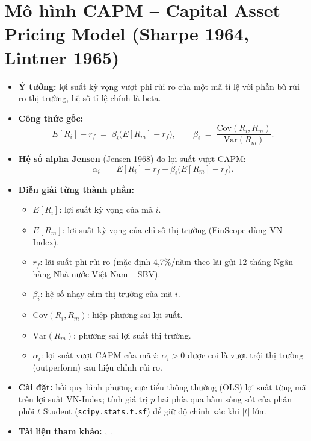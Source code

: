 \documentclass[12pt,a4paper,openany,oneside]{report}
\numberwithin{equation}{chapter}
\begin{document}
\section{Mô hình CAPM -- Capital Asset Pricing Model (Sharpe 1964, Lintner 1965)}

\begin{itemize}[leftmargin=18pt,topsep=2pt,itemsep=4pt]
  \item \textbf{Ý tưởng:} lợi suất kỳ vọng vượt phi rủi ro của một mã
        tỉ lệ với phần bù rủi ro thị trường, hệ số tỉ lệ chính là beta.
  \item \textbf{Công thức gốc:}
        \begin{equation}
          E[R_i] - r_f \;=\; \beta_i \bigl(E[R_m] - r_f\bigr),
          \qquad
          \beta_i \;=\; \frac{\mathrm{Cov}(R_i, R_m)}{\mathrm{Var}(R_m)}.
          \label{eq:capm}
        \end{equation}
  \item \textbf{Hệ số alpha Jensen} (Jensen 1968) đo lợi suất vượt CAPM:
        \begin{equation}
          \alpha_i \;=\; E[R_i] - r_f - \beta_i \bigl(E[R_m] - r_f\bigr).
          \label{eq:jensen}
        \end{equation}
  \item \textbf{Diễn giải từng thành phần:}
        \begin{itemize}[leftmargin=14pt,topsep=2pt,itemsep=1pt]
          \item $E[R_i]$: lợi suất kỳ vọng của mã $i$.
          \item $E[R_m]$: lợi suất kỳ vọng của chỉ số thị trường (FinScope
                dùng VN-Index).
          \item $r_f$: lãi suất phi rủi ro (mặc định 4,7\%/năm theo lãi
                gửi 12 tháng Ngân hàng Nhà nước Việt Nam -- SBV).
          \item $\beta_i$: hệ số nhạy cảm thị trường của mã $i$.
          \item $\mathrm{Cov}(R_i, R_m)$: hiệp phương sai lợi suất.
          \item $\mathrm{Var}(R_m)$: phương sai lợi suất thị trường.
          \item $\alpha_i$: lợi suất vượt CAPM của mã $i$; $\alpha_i > 0$
                được coi là vượt trội thị trường (outperform) sau hiệu
                chỉnh rủi ro.
        \end{itemize}
  \item \textbf{Cài đặt:} hồi quy bình phương cực tiểu thông thường
        (OLS) lợi suất từng mã trên lợi suất VN-Index; tính giá trị
        $p$ hai phía qua hàm sống sót của phân phối $t$ Student
        (\texttt{scipy.stats.t.sf}) để giữ độ chính xác khi $|t|$ lớn.
  \item \textbf{Tài liệu tham khảo:} \citet{Sharpe1964}, \citet{Lintner1965}.
\end{itemize}
\end{document}
